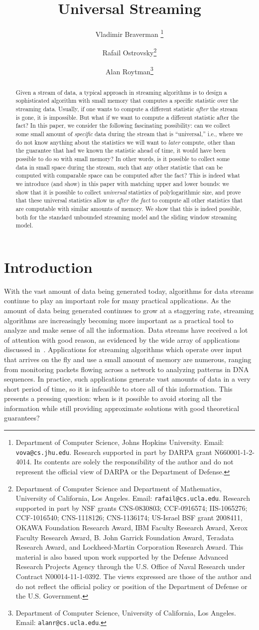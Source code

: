 \documentclass[11pt]{article}
\title{Universal Streaming}
\author{Vladimir Braverman
\thanks{
Department of Computer Science, Johns Hopkins University.
Email:
{\tt vova@cs.jhu.edu}.  Research supported in part by
DARPA grant N660001-1-2-4014. Its contents are solely the responsibility of the author and do not
represent the official view of DARPA or the Department of Defense.}
\and
Rafail Ostrovsky\thanks{
Department of Computer Science and Department of Mathematics, University of California, Los Angeles.
Email: {\tt rafail@cs.ucla.edu}.  Research supported in part by NSF grants CNS-0830803; CCF-0916574; IIS-1065276; 
CCF-1016540; CNS-1118126; CNS-1136174; US-Israel BSF grant 2008411, OKAWA Foundation Research Award, IBM 
Faculty Research Award, Xerox Faculty Research Award, B. John Garrick Foundation Award, Teradata 
Research Award, and Lockheed-Martin Corporation Research Award. This material is also based upon 
work supported by the Defense Advanced Research Projects Agency through the U.S. Office of Naval 
Research under Contract N00014-11-1-0392. The views expressed are those of the author and do 
not reflect the official policy or position of the Department of Defense or the U.S. Government.}
\and
Alan Roytman\thanks{
Department of Computer Science, University of California, Los Angeles.
Email: {\tt alanr@cs.ucla.edu}.}
}
\date{}
\begin{document}
\maketitle
\thispagestyle{empty}
\begin{abstract}
Given a stream of data, a typical approach in streaming algorithms is to design a sophisticated algorithm
with small memory that computes a specific statistic over the streaming data.  Usually, if one wants
to compute a different statistic {\em after} the stream is gone, it is impossible. But
what if we want to compute a different statistic after the fact?  In this paper, we consider the
following fascinating possibility: can we collect some small amount of {\em specific} data
during the stream that is ``universal,'' i.e., where we do not know anything about the statistics we
will want to {\em later} compute, other than the guarantee that had we known the statistic ahead of time,
it would have been possible to do so with small memory?  In other words, is it possible to collect
some data in small space during the stream, such that any other statistic that can be computed with comparable
space can be computed after the fact?  This is indeed what we introduce (and show) in this paper
with matching upper and lower bounds: we show that it is possible to collect {\em universal}
statistics of polylogarithmic size, and prove that these universal statistics allow us {\em after the fact}
to compute all other statistics that are computable with similar amounts of memory. We show that this is
indeed possible, both for the standard unbounded streaming model and the sliding window streaming model.
\end{abstract}

\section{Introduction}
With the vast amount of data being generated today, algorithms for data streams continue
to play an important role for many practical applications.
As the amount of data being generated
continues to grow at a staggering rate, streaming algorithms are increasingly becoming more important as a practical tool
to analyze and make sense of all the information.
Data streams have received a lot of attention
with good reason, as evidenced by the wide array of applications discussed in~\cite{A07,M05}.
Applications for streaming algorithms
which operate over input that arrives on the fly and use a small
amount of memory
are numerous, ranging from monitoring packets flowing across a network to analyzing
patterns in DNA sequences.  In practice, such applications generate vast amounts of data in a very short
period of time, so it is infeasible to store all of this information.
This presents a pressing
question: when is it possible to avoid storing all the information while still providing approximate
solutions with good theoretical guarantees?
\end{document}

